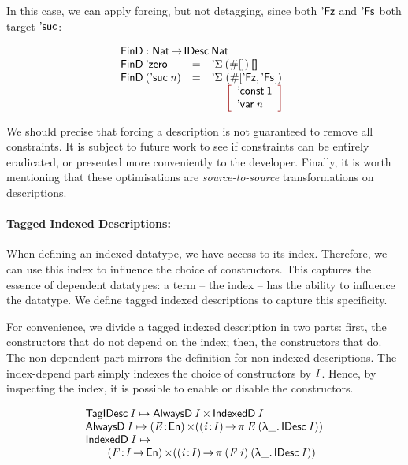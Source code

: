 In this case, we can apply forcing, but not detagging, since both
$\FinZero$ and $\FinSuc{\!}$ both target $\NatSuc{\!}$:

\[\stk{
\FinD : \Nat \To \IDesc{\Nat} \\
\begin{array}{@{}llll}
\FinD\: \NatZero     & = & \multicolumn{2}{l}{\DSigma{(\EnumT{[]})}{\Void} } \\
\FinD\: (\NatSuc{\V{n}}) & = & \DSigma{\!}{\!}\!\!\!\!\! & (\EnumT{[ \FinZero , \FinSuc{\!} ]}) \\
                     &   &             & \bigRedBracket{
                                         \begin{array}{l}
                                         \DConst{\Unit} \\
                                         \DVar{\V{n}}
                                         \end{array}
                                         }
\end{array}
}\]

We should precise that forcing a description is not guaranteed to
remove all constraints. It is subject to future work to see if
constraints can be entirely eradicated, or presented more conveniently
to the developer.  Finally, it is worth mentioning that these
optimisations are \emph{source-to-source} transformations on
descriptions.

\paragraph{Tagged Indexed Descriptions:}

When defining an indexed datatype, we have access to its
index. Therefore, we can use this index to influence the choice of
constructors. This captures the essence of dependent datatypes: a
term -- the index -- has the ability to influence the datatype. We
define tagged indexed descriptions to capture this specificity.

For convenience, we divide a tagged indexed description in two parts:
first, the constructors that do not depend on the index; then, the
constructors that do. The non-dependent part mirrors the definition
for non-indexed descriptions. The index-depend part simply indexes the
choice of constructors by $\V{I}$. Hence, by inspecting the index, it
is possible to enable or disable the constructors.

\[\stk{
 \TagIDesc{\V{I}}  \mapsto \TIMES{\ATagIDesc{\V{I}}}{\ITagIDesc{\V{I}}} \\
 \ATagIDesc{\V{I}} \mapsto \SIGMA{\V{E}}{\EnumU} (\PI{\V{i}}{\V{I}} \spi{\V{E}}{(\LAM{\_} \IDesc{\V{I}})}) \\
 \ITagIDesc{\V{I}} \mapsto \\
\qquad\SIGMA{\V{F}}{\V{I} \To \EnumU} (\PI{\V{i}}{\V{I}} \spi{(\V{F}\: \V{i})}{(\LAM{\_} \IDesc{\V{I}})}) 
}\]

